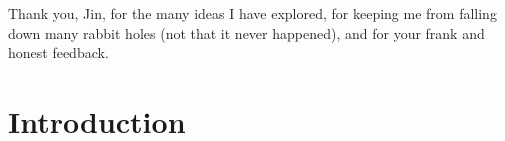 \documentclass{cshonours}
\begin{document}
\begin{abstract}
actions as an existing MTD simulator's scripted baseline attacker, in a
different order and at different times. We run both attackers on the same
networks, under seven MTD mechanisms at six deployment
intervals.
At every deployment interval, the most effective MTD mechanisms against the
APT attacker model change the network's addresses or layout, and those against
the baseline attacker change its services. At the default interval, service
diversity reduces the number of hosts the baseline attacker compromises by
92\,\%, but the number the APT attacker model compromises by 36\,\%. These
results make a case for
testing MTD against more than one attacker model.
\end{abstract}

\begin{acknowledgements}
Thank you, Jin, for the many ideas I have explored, for keeping me from falling down many rabbit holes
(not that it never happened), and for your frank and honest feedback.
\end{acknowledgements}

\tableofcontents

\chapter{Introduction}
\label{ch:intro}

\end{document}
